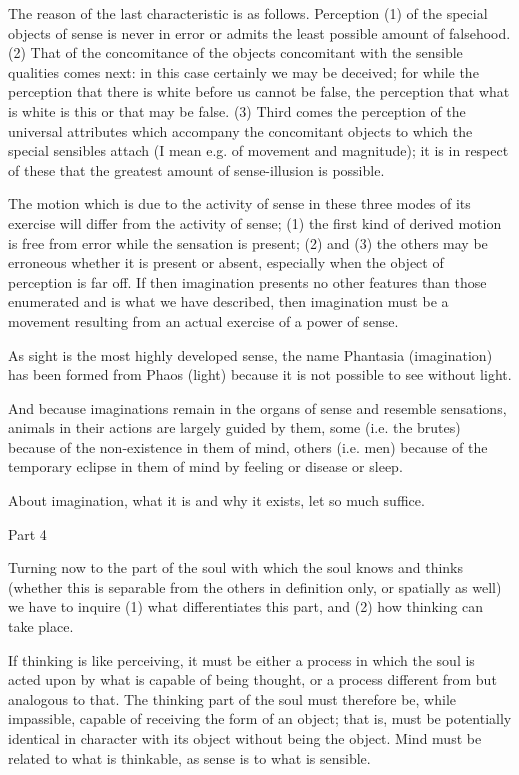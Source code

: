 The reason of the last characteristic is as follows. Perception (1)
of the special objects of sense is never in error or admits the least
possible amount of falsehood. (2) That of the concomitance of the
objects concomitant with the sensible qualities comes next: in this
case certainly we may be deceived; for while the perception that there
is white before us cannot be false, the perception that what is white
is this or that may be false. (3) Third comes the perception of the
universal attributes which accompany the concomitant objects to which
the special sensibles attach (I mean e.g. of movement and magnitude);
it is in respect of these that the greatest amount of sense-illusion
is possible. 

The motion which is due to the activity of sense in these three modes
of its exercise will differ from the activity of sense; (1) the first
kind of derived motion is free from error while the sensation is present;
(2) and (3) the others may be erroneous whether it is present or absent,
especially when the object of perception is far off. If then imagination
presents no other features than those enumerated and is what we have
described, then imagination must be a movement resulting from an actual
exercise of a power of sense. 

As sight is the most highly developed sense, the name Phantasia (imagination)
has been formed from Phaos (light) because it is not possible to see
without light. 

And because imaginations remain in the organs of sense and resemble
sensations, animals in their actions are largely guided by them, some
(i.e. the brutes) because of the non-existence in them of mind, others
(i.e. men) because of the temporary eclipse in them of mind by feeling
or disease or sleep. 

About imagination, what it is and why it exists, let so much suffice.

Part 4

Turning now to the part of the soul with which the soul knows and
thinks (whether this is separable from the others in definition only,
or spatially as well) we have to inquire (1) what differentiates this
part, and (2) how thinking can take place. 

If thinking is like perceiving, it must be either a process in which
the soul is acted upon by what is capable of being thought, or a process
different from but analogous to that. The thinking part of the soul
must therefore be, while impassible, capable of receiving the form
of an object; that is, must be potentially identical in character
with its object without being the object. Mind must be related to
what is thinkable, as sense is to what is sensible. 

